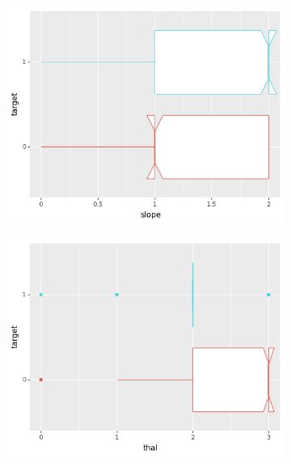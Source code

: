\begin{figure}[b]
     \begin{subfigure}[b]{0.32\textwidth}
         \centering
         \includegraphics[width=\textwidth]{plots/target-slope}
     \end{subfigure}
     \begin{subfigure}[b]{0.32\textwidth}
         \centering
         \includegraphics[width=\textwidth]{plots/target-thal}
     \end{subfigure}
     \begin{subfigure}[b]{0.32\textwidth}
         \centering

\end{subfigure}
\end{figure}

